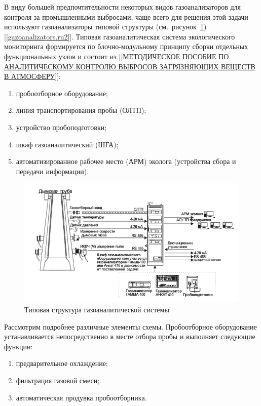 \documentclass[14pt, a4paper]{extreport}
\begin{document}
	В виду большей предпочтительности некоторых видов газоанализаторов для контроля за промышленными выбросами, чаще всего для решения этой задачи используют газоанализаторы типовой структуры (см.~рисунок~\ref{fig:typestructure}) [\ref{gazoanalizators.ru2}]. Типовая газоаналитическая система экологического мониторинга формируется по блочно-модульному принципу сборки отдельных функциональных узлов и состоит из [\ref{МЕТОДИЧЕСКОЕ ПОСОБИЕ ПО АНАЛИТИЧЕСКОМУ КОНТРОЛЮ ВЫБРОСОВ ЗАГРЯЗНЯЮЩИХ ВЕЩЕСТВ В АТМОСФЕРУ}]:
	\begin{enumerate}[label={\arabic*)}]
		\item пробоотборное оборудование;
		\item линия транспортирования пробы (ОЛТП);
		\item устройство пробоподготовки;
		\item шкаф газоаналитический (ШГА);
		\item автоматизированное рабочее место (АРМ) эколога (устройства сбора и передачи информации).
	\end{enumerate}
	
	\begin{figure}[h!]
		\centering
		\includegraphics[width = \textwidth]{image/chapter_1/typestructure}	
		\caption{Типовая структура газоаналитической системы}
		\label{fig:typestructure}
	\end{figure}
	
	Рассмотрим подробнее различные элементы схемы. Пробоотборное оборудование устанавливается непосредственно в месте отбора пробы и выполняет следующие функции:
	\begin{enumerate}[label={\arabic*)}]
		\item предварительное охлаждение;
		\item фильтрация газовой смеси;
		\item автоматическая продувка пробоотборника.
	\end{enumerate}
	
\end{document}
